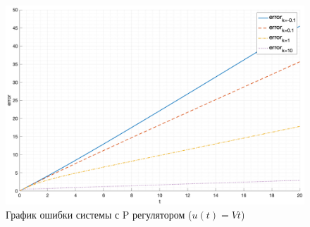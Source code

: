 \begin{figure}
    \centering
    \includegraphics[width=\textwidth]{"media/plots/task3_error2.png"}
    \caption{График ошибки системы с P регулятором ($u(t) = Vt$)}
    \label{fig:task3_error2}
\end{figure}







